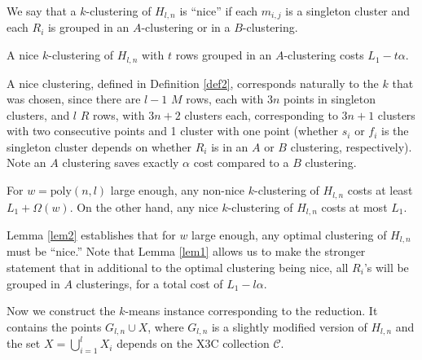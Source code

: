 \begin{definition}\label{def2}
We say that a $k$-clustering of $H_{l,n}$ is ``nice'' if each $m_{i,j}$ is a singleton cluster and each $R_i$ is grouped in an $A$-clustering or in a $B$-clustering.
\end{definition}

\begin{lemma}\label{lem1}
A nice $k$-clustering of $H_{l,n}$ with $t$ rows grouped in an $A$-clustering costs $L_1-t\alpha$.
\end{lemma}

A nice clustering, defined in Definition \ref{def2}, corresponds naturally to the $k$ that was chosen, since there are $l-1$ $M$ rows, each with $3n$ points in singleton clusters, and $l$ $R$ rows, with $3n+2$ clusters each, corresponding to $3n+1$ clusters with two consecutive points and 1 cluster with one point (whether $s_i$ or $f_i$ is the singleton cluster depends on whether $R_i$ is in an $A$ or $B$ clustering, respectively). Note an $A$ clustering saves exactly $\alpha$ cost compared to a $B$ clustering.

\begin{lemma}\label{lem2}
For $w=\text{poly}(n,l)$ large enough, any non-nice $k$-clustering of $H_{l,n}$ costs at least $L_1+\Omega(w)$. On the other hand, any nice $k$-clustering of $H_{l,n}$ costs at most $L_1$.
\end{lemma}

Lemma \ref{lem2} establishes that for $w$ large enough, any optimal clustering of $H_{l,n}$ must be ``nice.'' Note that Lemma \ref{lem1} allows us to make the stronger statement that in additional to the optimal clustering being nice, all $R_i$'s will be grouped in $A$ clusterings, for a total cost of $L_1-l\alpha$.


Now we construct the $k$-means instance corresponding to the reduction. It contains the points $G_{l,n}\cup X$, where $G_{l,n}$ is a slightly modified version of $H_{l,n}$ and the set $X=\bigcup_{i=1}^l X_i$ depends on the X3C collection $\mathcal{C}$.

